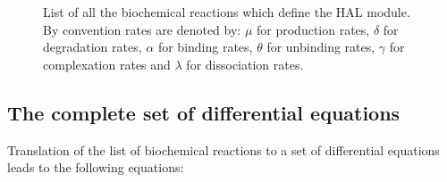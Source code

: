 \documentclass[12pt]{article}
\newcommand{\p}{\vspace{5 mm}\noindent}
\begin{document}
\begin{figure}[H]
\caption{List of all the biochemical reactions which define the HAL module. By convention rates are denoted by: $\mu$ for production rates, $\delta$ for degradation rates, $\alpha$ for binding rates, $\theta$ for unbinding rates, $\gamma$ for complexation rates and $\lambda$ for dissociation rates.}
\label{BiochemicalReactions}
\end{figure}

\subsection{The complete set of differential equations}

\p Translation of the list of biochemical reactions to a set of differential equations leads to the following equations:
\end{document}
